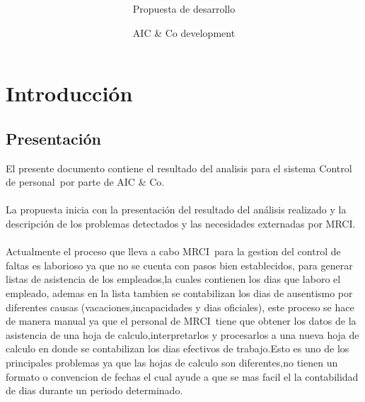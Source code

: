 \documentclass[10pt]{book}
\title{\nombreProyecto\\}
\subtitle{\bigskip Propuesta de desarrollo}
\author{AIC \& Co development }
\newcommand{\nombreProyecto}{ Control de personal}
\newcommand{\empresa}{AIC \& Co}
\newcommand{\cliente}{MRCI}
\begin{document}
 


\pagestyle{empty}
\maketitle


\chapter{Introducción} 

\section{Presentación}

	El presente documento contiene el resultado del analisis  para el sistema \nombreProyecto \  por parte de  \empresa.
	\\
	\\
	La propuesta inicia con la presentación del resultado del análisis realizado y la descripción de los problemas detectados y las necesidades externadas por \cliente.
        \\\\
        
	Actualmente el proceso que lleva a cabo \cliente \ para la gestion del control de faltas es laborioso ya que no se cuenta con pasos bien establecidos, para generar listas de asistencia
	de los empleados,la cuales contienen los dias que laboro el empleado,  ademas en la lista tambien se contabilizan los dias de ausentismo por diferentes causas (vacaciones,incapacidades y dias oficiales),
	este proceso se hace de manera manual ya que el personal de \cliente  \ tiene que obtener los datos de la asistencia de una hoja de calculo,interpretarlos y procesarlos a una nueva hoja de calculo
	en donde se contabilizan los dias efectivos de trabajo.Esto es uno de los principales problemas ya que las hojas de calculo son diferentes,no tienen un formato o convencion de fechas el 
	cual ayude a que se mas facil el la contabilidad de dias durante un periodo determinado.
	
\end{document}
